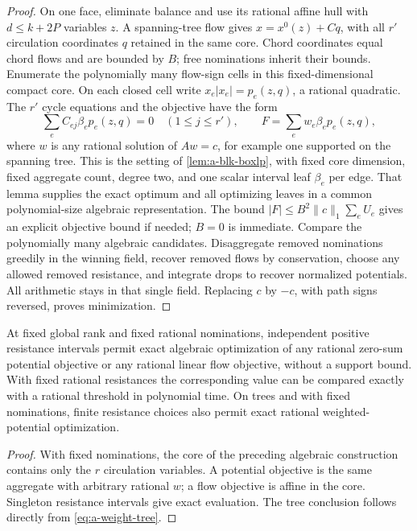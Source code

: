 \begin{proof}
On one face, eliminate balance and use its rational affine hull with
$d\le k+2P$ variables $z$. A spanning-tree flow gives
$x=x^0(z)+Cq$, with all $r'$ circulation coordinates $q$ retained in the
same core. Chord coordinates equal chord flows and are bounded by $B$;
free nominations inherit their bounds. Enumerate the polynomially many
flow-sign cells in this fixed-dimensional compact core. On each closed
cell write $x_e|x_e|=p_e(z,q)$, a rational quadratic. The $r'$ cycle
equations and the objective have the form
\[
 \sum_e C_{ej}\beta_ep_e(z,q)=0\quad(1\le j\le r'),
 \qquad F=\sum_e w_e\beta_ep_e(z,q),
\]
where $w$ is any rational solution of $Aw=c$, for example one supported
on the spanning tree. This is the setting of
\cref{lem:a-blk-boxlp}, with fixed core dimension, fixed aggregate count,
degree two, and one scalar interval leaf $\beta_e$ per edge. That lemma
supplies the exact optimum and all optimizing leaves in a common
polynomial-size algebraic representation. The bound
$|F|\le B^2\|c\|_1\sum_eU_e$ gives an explicit objective bound if needed;
$B=0$ is immediate. Compare the polynomially many algebraic candidates.
Disaggregate removed nominations greedily in the winning field, recover
removed flows by conservation, choose any allowed removed resistance, and
integrate drops to recover normalized potentials. All arithmetic stays
in that single field. Replacing $c$ by $-c$, with path signs reversed,
proves minimization.
\end{proof}

\begin{corollary}
\label{cor:a-weight-fixed-nom}
At fixed global rank and fixed rational nominations, independent positive
resistance intervals permit exact algebraic optimization of any rational
zero-sum potential objective or any rational linear flow objective,
without a support bound. With fixed rational resistances the corresponding
value can be compared exactly with a rational threshold in polynomial
time. On trees and with fixed nominations, finite resistance choices
also permit exact rational weighted-potential optimization.
\end{corollary}
\begin{proof}
With fixed nominations, the core of the preceding algebraic construction
contains only the $r$ circulation variables. A potential objective is
the same aggregate with arbitrary rational $w$; a flow objective is
affine in the core. Singleton resistance intervals give exact evaluation.
The tree conclusion follows directly from \cref{eq:a-weight-tree}.
\end{proof}


